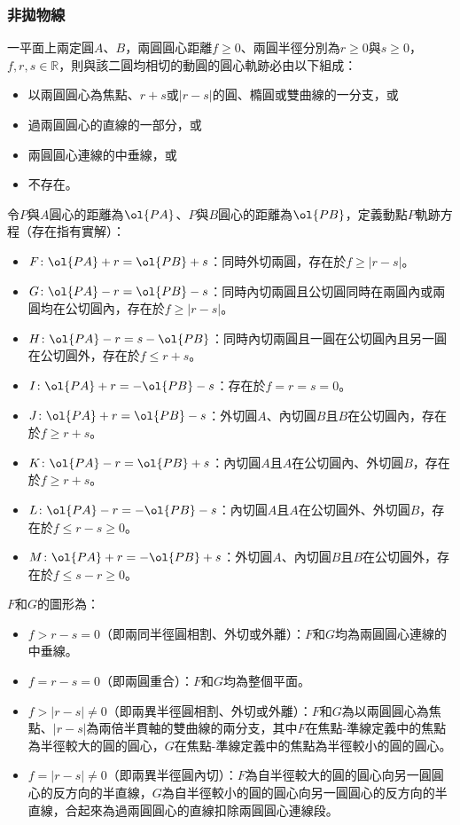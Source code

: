 \documentclass[a4paper,12pt]{report}
\begin{document}
\subsubsection{非拋物線}
一平面上兩定圓$A$、$B$，兩圓圓心距離$f\geq 0$、兩圓半徑分別為$r\geq 0$與$s\geq 0$，$f,r,s\in\mathbb{R}$，則與該二圓均相切的動圓的圓心軌跡必由以下組成：
\begin{itemize}
\item 以兩圓圓心為焦點、$r+s$或$|r-s|$的圓、橢圓或雙曲線的一分支，或
\item 過兩圓圓心的直線的一部分，或
\item 兩圓圓心連線的中垂線，或
\item 不存在。
\end{itemize}
令$P$與$A$圓心的距離為$\ol{PA}$、$P$與$B$圓心的距離為$\ol{PB}$，定義動點$P$軌跡方程（存在指有實解）：
\begin{itemize}
\item $F\colon\ol{PA}+r=\ol{PB}+s$：同時外切兩圓，存在於$f\geq|r-s|$。
\item $G\colon\ol{PA}-r=\ol{PB}-s$：同時內切兩圓且公切圓同時在兩圓內或兩圓均在公切圓內，存在於$f\geq|r-s|$。
\item $H\colon\ol{PA}-r=s-\ol{PB}$：同時內切兩圓且一圓在公切圓內且另一圓在公切圓外，存在於$f\leq r+s$。
\item $I\colon\ol{PA}+r=-\ol{PB}-s$：存在於$f=r=s=0$。
\item $J\colon\ol{PA}+r=\ol{PB}-s$：外切圓$A$、內切圓$B$且$B$在公切圓內，存在於$f\geq r+s$。
\item $K\colon\ol{PA}-r=\ol{PB}+s$：內切圓$A$且$A$在公切圓內、外切圓$B$，存在於$f\geq r+s$。
\item $L\colon\ol{PA}-r=-\ol{PB}-s$：內切圓$A$且$A$在公切圓外、外切圓$B$，存在於$f\leq r-s\geq 0$。
\item $M\colon\ol{PA}+r=-\ol{PB}+s$：外切圓$A$、內切圓$B$且$B$在公切圓外，存在於$f\leq s-r\geq 0$。
\end{itemize}
$F$和$G$的圖形為：
\begin{itemize}
\item $f>r-s=0$（即兩同半徑圓相割、外切或外離）：$F$和$G$均為兩圓圓心連線的中垂線。
\item $f=r-s=0$（即兩圓重合）：$F$和$G$均為整個平面。
\item $f>|r-s|\neq 0$（即兩異半徑圓相割、外切或外離）：$F$和$G$為以兩圓圓心為焦點、$|r-s|$為兩倍半貫軸的雙曲線的兩分支，其中$F$在焦點-準線定義中的焦點為半徑較大的圓的圓心，$G$在焦點-準線定義中的焦點為半徑較小的圓的圓心。
\item $f=|r-s|\neq 0$（即兩異半徑圓內切）：$F$為自半徑較大的圓的圓心向另一圓圓心的反方向的半直線，$G$為自半徑較小的圓的圓心向另一圓圓心的反方向的半直線，合起來為過兩圓圓心的直線扣除兩圓圓心連線段。
\end{itemize}
\end{document}
